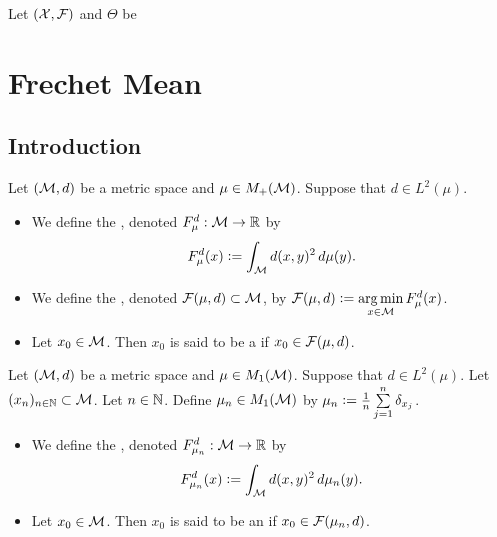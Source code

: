\documentclass{book}
\begin{document}
	\begin{defn}
	Let $(\mathcal{X}, \mathcal{F})$ and $\Theta$ be
	\end{defn}	






















	\newpage
	\chapter{Frechet Mean}
	
	\section{Introduction}
	
	\begin{defn}
		Let $(\mathcal{M}, d)$ be a metric space and $\mu \in M_+(\mathcal{M})$. Suppose that $d \in L^2(\mu)$. 
		\begin{itemize}
			\item We define the , denoted $F^d_{\mu}: \mathcal{M} \rightarrow \mathbb{R}$ by 
			$$F_{\mu}^d(x) \vcentcolon= \int_{\mathcal{M}} d(x, y)^2 \, d \mu(y).$$
			\item We define the , denoted $\mathcal{F}(\mu, d) \subset \mathcal{M}$, by $\mathcal{F}(\mu, d) \vcentcolon= \operatorname*{arg\,min}\limits_{x \in \mathcal{M}} F^d_{\mu}(x)$.  
			\item Let $x_0 \in \mathcal{M}$. Then $x_0$ is said to be a  if $x_0 \in \mathcal{F}(\mu, d)$. 
		\end{itemize}
	\end{defn}	

	\begin{defn}
		Let $(\mathcal{M}, d)$ be a metric space and $\mu \in M_1(\mathcal{M})$. Suppose that $d \in L^2(\mu)$. Let $(x_n)_{n \in \mathbb{N}} \subset \mathcal{M}$. Let $n \in \mathbb{N}$. Define $\mu_n \in M_1(\mathcal{M})$ by $\mu_n \vcentcolon= \frac{1}{n} \sum\limits_{j=1}^n \delta_{x_j}$.
		\begin{itemize}
			\item We define the , denoted $F^d_{\mu_n}: \mathcal{M} \rightarrow \mathbb{R}$ by 
			$$ F^d_{\mu_n}(x) \vcentcolon= \int_{\mathcal{M}} d(x, y)^2 \, d \mu_n(y).$$
			\item Let $x_0 \in \mathcal{M}$. Then $x_0$ is said to be an  if $x_0 \in \mathcal{F}(\mu_n, d)$. 
		\end{itemize}
	\end{defn}
\end{document}
